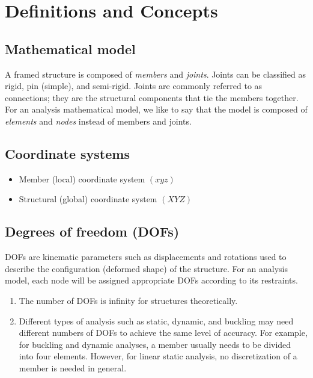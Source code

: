 \chapter{Definitions and Concepts}

\section{Mathematical model}
A framed structure is composed of \emph{members} and \emph{joints}. Joints can be classified as rigid, pin (simple), and semi-rigid. Joints are commonly referred to as connections; they are the structural components that tie the members together. For an analysis mathematical model, we like to say that the model is composed of \emph{elements} and \emph{nodes} instead of members and joints.

\section{Coordinate systems}
\begin{itemize}
  \item Member (local) coordinate system $(xyz)$
  \item Structural (global) coordinate system $(XYZ)$
\end{itemize}
\begin{fig}
  
\end{fig}

\section{Degrees of freedom (DOFs)}
DOFs are kinematic parameters such as displacements and rotations used to describe the configuration (deformed shape) of the structure. For an analysis model, each node will be assigned appropriate DOFs according to its restraints.

\begin{remark}
\begin{enumerate}
  \item The number of DOFs is infinity for structures theoretically.
  \item Different types of analysis such as static, dynamic, and buckling may need different numbers of DOFs to achieve the same level of accuracy. For example, for buckling and dynamic analyses, a member usually needs to be divided into four elements. However, for linear static analysis, no discretization of a member is needed in general.
\end{enumerate}
\end{remark}

